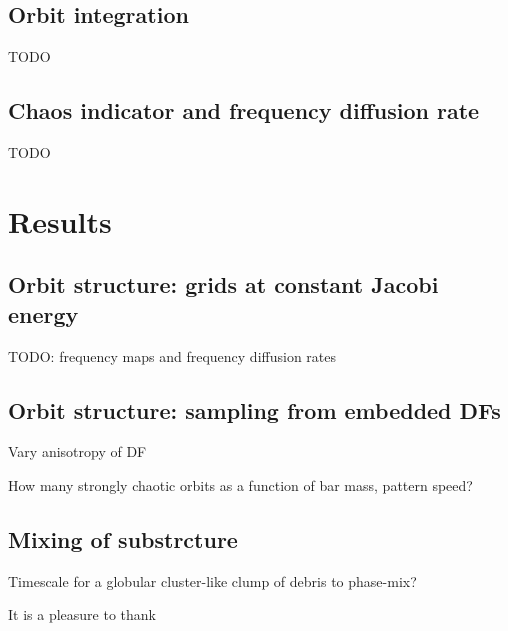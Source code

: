 \documentclass[modern]{aastex61}
\begin{document}
\subsection{Orbit integration} \label{sec:orbit-int}

TODO

\subsection{Chaos indicator and frequency diffusion rate} \label{sec:freqdiff}

TODO

\section{Results} \label{sec:results}

\subsection{Orbit structure: grids at constant Jacobi energy}

TODO: frequency maps and frequency diffusion rates

\subsection{Orbit structure: sampling from embedded DFs}

Vary anisotropy of DF

How many strongly chaotic orbits as a function of bar mass, pattern speed?

\subsection{Mixing of substrcture}

Timescale for a globular cluster-like clump of debris to phase-mix?

\acknowledgements

It is a pleasure to thank





\clearpage


\end{document}
